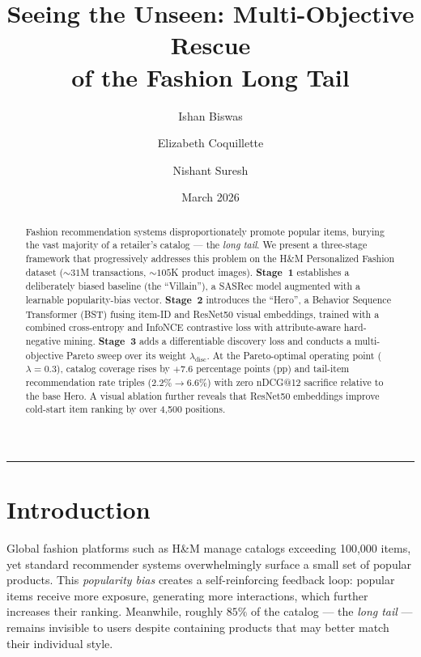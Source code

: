 \documentclass[11pt, a4paper]{article}
\title{\textbf{Seeing the Unseen: Multi-Objective Rescue\\of the Fashion Long Tail}}
\author[1]{Ishan Biswas}
\author[1]{Elizabeth Coquillette}
\author[1]{Nishant Suresh}
\affil[1]{CS7180 --- Applied Deep Learning, Northeastern University, Spring 2026}
\date{March 2026}
\let\oldsection\section
\renewcommand{\section}[1]{\FloatBarrier\oldsection{#1}}
\begin{document}
\maketitle

\begin{abstract}
\noindent
Fashion recommendation systems disproportionately promote popular items, burying the vast majority of a retailer's catalog --- the \emph{long tail}.
We present a three-stage framework that progressively addresses this problem on the H\&M Personalized Fashion dataset (${\sim}31$M transactions, ${\sim}105$K product images).
\textbf{Stage~1} establishes a deliberately biased baseline (the ``Villain''), a SASRec model augmented with a learnable popularity-bias vector.
\textbf{Stage~2} introduces the ``Hero'', a Behavior Sequence Transformer (BST) fusing item-ID and ResNet50 visual embeddings, trained with a combined cross-entropy and InfoNCE contrastive loss with attribute-aware hard-negative mining.
\textbf{Stage~3} adds a differentiable discovery loss and conducts a multi-objective Pareto sweep over its weight $\lambda_{\text{disc}}$.
At the Pareto-optimal operating point ($\lambda{=}0.3$), catalog coverage rises by $+7.6$ percentage points (pp) and tail-item recommendation rate triples ($2.2\%{\to}6.6\%$) with zero nDCG@12 sacrifice relative to the base Hero.
A visual ablation further reveals that ResNet50 embeddings improve cold-start item ranking by over 4{,}500 positions.
\end{abstract}

\vspace{0.5em}
\hrule
\vspace{1em}

\section{Introduction}
\label{sec:intro}

Global fashion platforms such as H\&M manage catalogs exceeding 100{,}000 items, yet standard recommender systems overwhelmingly surface a small set of popular products.
This \emph{popularity bias} creates a self-reinforcing feedback loop: popular items receive more exposure, generating more interactions, which further increases their ranking.
Meanwhile, roughly $85\%$ of the catalog --- the \emph{long tail} --- remains invisible to users despite containing products that may better match their individual style.
\end{document}
